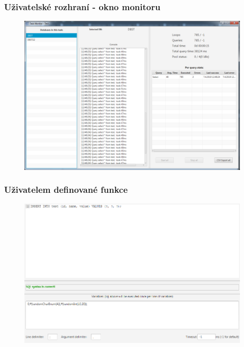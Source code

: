 \documentclass{beamer}
\begin{document}
\begin{frame}
  \frametitle{Uživatelské rozhraní - okno monitoru}
  \begin{figure}[h]
\centering
\includegraphics[width=1.0\textwidth]{img/taskmonitor.png}
\end{figure}

\end{frame}




\begin{frame}
  \frametitle{Uživatelem definované funkce}
    \begin{figure}[h]
  \centering
\includegraphics[width=1.0\textwidth]{img/function.png}
\end{figure}
\end{frame}
\end{document}
